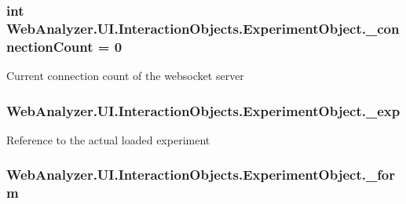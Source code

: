 \subsubsection[{\+\_\+connection\+Count}]{\setlength{\rightskip}{0pt plus 5cm}int Web\+Analyzer.\+U\+I.\+Interaction\+Objects.\+Experiment\+Object.\+\_\+connection\+Count = 0\hspace{0.3cm}{\ttfamily [private]}}\label{class_web_analyzer_1_1_u_i_1_1_interaction_objects_1_1_experiment_object_a1f1e01810382952ce7e524f55f8cbdd7}


Current connection count of the websocket server 

\hypertarget{class_web_analyzer_1_1_u_i_1_1_interaction_objects_1_1_experiment_object_a8275ff9c2a3971c6250a462e7e248843}{}
\subsubsection[{\+\_\+exp}]{ Web\+Analyzer.\+U\+I.\+Interaction\+Objects.\+Experiment\+Object.\+\_\+exp\hspace{0.3cm}{\ttfamily [private]}}\label{class_web_analyzer_1_1_u_i_1_1_interaction_objects_1_1_experiment_object_a8275ff9c2a3971c6250a462e7e248843}


Reference to the actual loaded experiment 

\hypertarget{class_web_analyzer_1_1_u_i_1_1_interaction_objects_1_1_experiment_object_a5a2cb9630e25671701fa7d900d4fec83}{}
\subsubsection[{\+\_\+form}]{ Web\+Analyzer.\+U\+I.\+Interaction\+Objects.\+Experiment\+Object.\+\_\+form\hspace{0.3cm}{\ttfamily [private]}}\label{class_web_analyzer_1_1_u_i_1_1_interaction_objects_1_1_experiment_object_a5a2cb9630e25671701fa7d900d4fec83}


